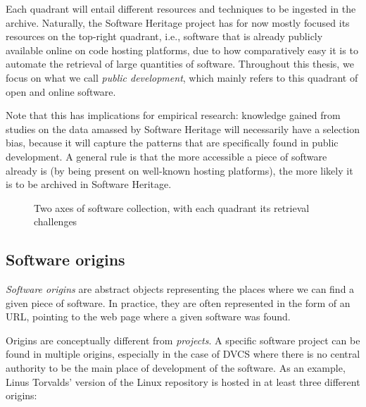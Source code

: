 Each quadrant will entail different resources and techniques to be ingested in
the archive. Naturally, the Software Heritage project has for now mostly
focused its resources on the top-right quadrant, i.e., software that is already
publicly available online on code hosting platforms, due to how comparatively
easy it is to automate the retrieval of large quantities of software.
Throughout this thesis, we focus on what we call \emph{public development},
which mainly refers to this quadrant of open and online software.

Note that this has implications for empirical research: knowledge gained from
studies on the data amassed by Software Heritage will necessarily have a
selection bias, because it will capture the patterns that are specifically
found in public development. A general rule is that the more accessible a
piece of software already is (by being present on well-known hosting
platforms), the more likely it is to be archived in Software Heritage.

\begin{figure}
    \centering
    \caption{Two axes of software collection, with each quadrant its
    retrieval challenges}%
    \label{fig:swh-collect-axes}
\end{figure}

\subsection{Software origins}

\emph{Software origins} are abstract objects representing the places where we
can find a given piece of software. In practice, they are often represented in
the form of an URL, pointing to the web page where a given software was found.

Origins are conceptually different from \emph{projects}. A specific software
project can be found in multiple origins, especially in the case of \gls{DVCS}
where there is no central authority to be the main place of development of the
software. As an example, Linus Torvalds' version of the Linux repository is
hosted in at least three different origins:

